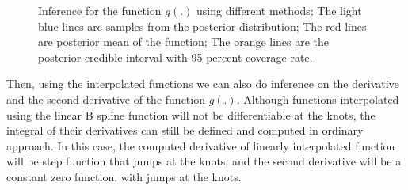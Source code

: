 \documentclass{article}
\begin{document}
\begin{figure}[p]
{    }
    \caption{Inference for the function $g(.)$ using different methods; The light blue lines are samples from the posterior distribution; The red lines are posterior mean of the function; The orange lines are the posterior credible interval with 95 percent coverage rate.}
    \label{fig:sim1func}
\end{figure}


Then, using the interpolated functions we can also do inference on the derivative and the second derivative of the function $g(.)$. Although functions interpolated using the linear B spline function will not be differentiable at the knots, the integral of their derivatives can still be defined and computed in ordinary approach. In this case, the computed derivative of linearly interpolated function will be step function that jumps at the knots, and the second derivative will be a constant zero function, with jumps at the knots.
\end{document}
